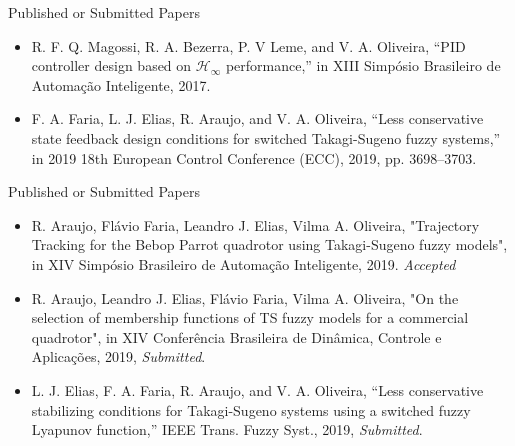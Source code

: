 \begin{frame}{Published or Submitted Papers}
	\begin{itemize}
		\item R. F. Q. Magossi, R. A. Bezerra, P. V Leme, and V. A. Oliveira, “PID controller design based on $\mathcal{H}_\infty$ performance,” in XIII Simpósio Brasileiro de Automação Inteligente, 2017.
		
		\item F. A. Faria, L. J. Elias, R. Araujo, and V. A. Oliveira, “Less conservative state feedback design conditions for switched Takagi-Sugeno fuzzy systems,” in 2019 18th European Control Conference (ECC), 2019, pp. 3698–3703.
	\end{itemize}

\end{frame}



\begin{frame}{Published or Submitted Papers}
	\begin{itemize}
		
		\item R. Araujo, Flávio Faria, Leandro J. Elias, Vilma A. Oliveira, "Trajectory Tracking for the Bebop Parrot quadrotor using Takagi-Sugeno fuzzy models", in XIV Simpósio Brasileiro de Automação Inteligente, 2019. \textit{Accepted}
		
		\item R. Araujo, Leandro J. Elias, Flávio Faria, Vilma A. Oliveira, "On the selection of membership functions of TS fuzzy models for a commercial quadrotor", in XIV Conferência Brasileira de Dinâmica, Controle e Aplicações, 2019, \textit{Submitted}.
		
		
		\item L. J. Elias, F. A. Faria, R. Araujo, and V. A. Oliveira, “Less conservative stabilizing conditions for Takagi-Sugeno systems using a switched fuzzy Lyapunov function,” IEEE Trans. Fuzzy Syst., 2019, \textit{Submitted}.
		
	\end{itemize}
	
\end{frame}




